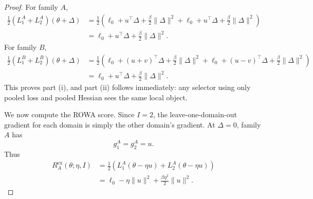 \documentclass{article}
\newcommand{\rowa}{\textup{\textsc{ROWA}}}
\begin{document}
\begin{proof}
For family $A$,
\begin{align}
    \frac{1}{2}(L_1^A + L_2^A)(\theta+\Delta)
    &=
    \frac{1}{2}\left(
        \ell_0 + u^\top \Delta + \frac{\beta}{2}\|\Delta\|^2
        +
        \ell_0 + u^\top \Delta + \frac{\beta}{2}\|\Delta\|^2
    \right) \\
    &=
    \ell_0 + u^\top \Delta + \frac{\beta}{2}\|\Delta\|^2.
\end{align}
For family $B$,
\begin{align}
    \frac{1}{2}(L_1^B + L_2^B)(\theta+\Delta)
    &=
    \frac{1}{2}\left(
        \ell_0 + (u+v)^\top \Delta + \frac{\beta}{2}\|\Delta\|^2
        +
        \ell_0 + (u-v)^\top \Delta + \frac{\beta}{2}\|\Delta\|^2
    \right) \\
    &=
    \ell_0 + u^\top \Delta + \frac{\beta}{2}\|\Delta\|^2.
\end{align}
This proves part (i), and part (ii) follows immediately: any selector using only pooled loss and pooled Hessian sees the same local object.

We now compute the \rowa{} score. Since $I=2$, the leave-one-domain-out gradient for each domain is simply the other domain's gradient. At $\Delta=0$, family $A$ has
\begin{equation}
    g_1^A = g_2^A = u.
\end{equation}
Thus
\begin{align}
    R_A^{\mathrm{ex}}(\theta;\eta,I)
    &=
    \frac{1}{2}\left(
        L_1^A(\theta - \eta u) + L_2^A(\theta - \eta u)
    \right) \\
    &=
    \ell_0 - \eta \|u\|^2 + \frac{\beta\eta^2}{2}\|u\|^2.
\end{align}


\end{proof}
\end{document}
